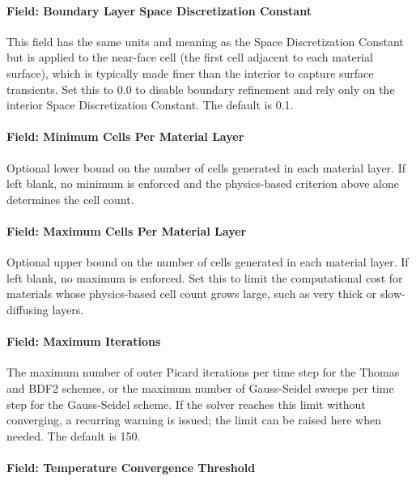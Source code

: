 \paragraph{Field: Boundary Layer Space Discretization Constant}\label{field-boundary-layer-space-discretization-constant}

This field has the same units and meaning as the Space Discretization Constant but is applied to the near-face cell (the first cell adjacent to each material surface), which is typically made finer than the interior to capture surface transients. Set this to 0.0 to disable boundary refinement and rely only on the interior Space Discretization Constant. The default is 0.1.

\paragraph{Field: Minimum Cells Per Material Layer}\label{field-minimum-cells-per-material-layer}

Optional lower bound on the number of cells generated in each material layer. If left blank, no minimum is enforced and the physics-based criterion above alone determines the cell count.

\paragraph{Field: Maximum Cells Per Material Layer}\label{field-maximum-cells-per-material-layer}

Optional upper bound on the number of cells generated in each material layer. If left blank, no maximum is enforced. Set this to limit the computational cost for materials whose physics-based cell count grows large, such as very thick or slow-diffusing layers.

\paragraph{Field: Maximum Iterations}\label{field-maximum-iterations-hamt}

The maximum number of outer Picard iterations per time step for the Thomas and BDF2 schemes, or the maximum number of Gauss-Seidel sweeps per time step for the Gauss-Seidel scheme. If the solver reaches this limit without converging, a recurring warning is issued; the limit can be raised here when needed. The default is 150.

\paragraph{Field: Temperature Convergence Threshold}\label{field-temperature-convergence-threshold-hamt}


